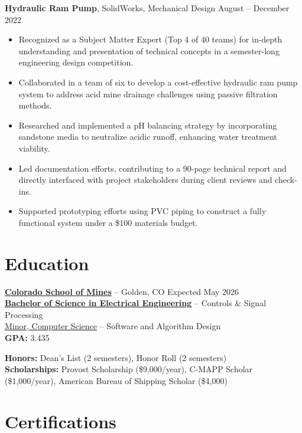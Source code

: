 \documentclass[11pt]{article}       %
\begin{document}
\newpage
\textbf{Hydraulic Ram Pump}, SolidWorks, Mechanical Design \hfill August -- December 2022
\vspace{-5pt}
\begin{itemize}
  \item Recognized as a Subject Matter Expert (Top 4 of 40 teams) for in-depth understanding and presentation of technical concepts in a semester-long engineering design competition.
  \item Collaborated in a team of six to develop a cost-effective hydraulic ram pump system to address acid mine drainage challenges using passive filtration methods.
  \item Researched and implemented a pH balancing strategy by incorporating sandstone media to neutralize acidic runoff, enhancing water treatment viability.
  \item Led documentation efforts, contributing to a 90-page technical report and directly interfaced with project stakeholders during client reviews and check-ins.
  \item Supported prototyping efforts using PVC piping to construct a fully functional system under a \$100 materials budget.
\end{itemize}


\vspace{-12pt}
\section*{Education}
\vspace{3pt}

\textbf{\href{https://www.mines.edu/}{Colorado School of Mines}} -- Golden, CO \hfill Expected May 2026 \\
\textbf{\href{https://electrical.mines.edu/undergraduate-program/}{Bachelor of Science in Electrical Engineering}} -- Controls \& Signal Processing \\
\href{https://cs.mines.edu/csmines-minors-and-areas-of-special-interest/}{Minor, Computer Science} -- Software and Algorithm Design \\
\textbf{GPA:} 3.435

\textbf{Honors:} Dean's List (2 semesters), Honor Roll (2 semesters) \\
\textbf{Scholarships:} Provost Scholarship (\$9,000/year), C-MAPP Scholar (\$1,000/year), American Bureau of Shipping Scholar (\$4,000)

\vspace{-8pt}
\section*{Certifications}
\vspace{3pt}
\end{document}
